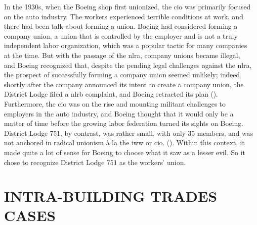 \documentclass[12pt]{article}
\begin{document}
In the 1930s, when the Boeing shop first unionized, the \acrshort{cio} was primarily focused on the auto industry. The workers experienced terrible conditions at work, and there had been talk about forming a union. Boeing had considered forming a company union, a union that is controlled by the employer and is not a truly independent labor organization, which was a popular tactic for many companies at the time. But with the passage of the \acrshort{nlra}, company unions became illegal, and Boeing recognized that, despite the pending legal challenges against the \acrshort{nlra}, the prospect of successfully forming a company union seemed unlikely; indeed, shortly after the company announced its intent to create a company union, the District Lodge filed a \acrshort{nlrb} complaint, and Boeing retracted its plan (\cite[23-24]{mccannBloodWaterHistory1989}). Furthermore, the \acrshort{cio} was on the rise and mounting militant challenges to employers in the auto industry, and Boeing thought that it would only be a matter of time before the growing labor federation turned its sights on Boeing. District Lodge 751, by contrast, was rather small, with only 35 members, and was not anchored in radical unionism \`{a} la the \acrshort{iww} or \acrshort{cio}. (\cite[24]{mccannBloodWaterHistory1989}). Within this context, it made quite a lot of sense for Boeing to choose what it saw as a lesser evil. So it chose to recognize District Lodge 751 as the workers' union.


\section{INTRA-BUILDING TRADES CASES}
\end{document}
